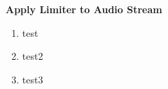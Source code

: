 \item \textbf{Apply Limiter to Audio Stream}
\begin{enumerate}
\item test
\item test2
\item test3


\end{enumerate}